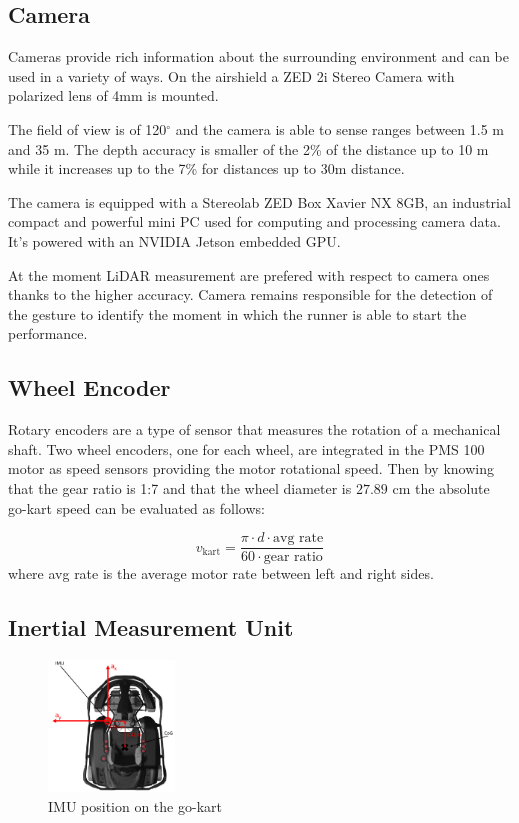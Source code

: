 \documentclass[a4paper,12pt,oneside]{book}
\begin{document}
\subsection{Camera}
Cameras provide rich information about the surrounding environment and can be used in a variety of ways.
On the airshield a ZED 2i Stereo Camera with polarized lens of 4mm is mounted.

The field of view is of 120$^\circ$ and the camera is able to sense ranges between 1.5 m and 35 m. 
The depth accuracy is smaller of the 2\% of the distance up to 10 m while it increases up to the 7\% for distances up to 30m distance.

The camera is equipped with a Stereolab ZED Box Xavier NX 8GB, an industrial compact and powerful mini PC used for computing and processing camera data.
It's powered with an NVIDIA Jetson embedded GPU.

At the moment LiDAR measurement are prefered with respect to camera ones thanks to the higher accuracy.
Camera remains responsible for the detection of the gesture to identify the moment in which the runner is able to start the performance. 

\subsection{Wheel Encoder}
Rotary encoders are a type of sensor that measures the rotation of a mechanical shaft.
Two wheel encoders, one for each wheel, are integrated in the PMS 100 motor as speed sensors providing the motor rotational speed.
Then by knowing that the gear ratio is 1:7 and that the wheel diameter is $27.89$ cm the absolute go-kart speed can be evaluated as follows:

\begin{equation}
    v_{\text{kart}} = \frac{\pi \cdot d \cdot \text{avg rate}}{60 \cdot \text{gear ratio}}
\end{equation}
where avg rate is the average motor rate between left and right sides.



\subsection{Inertial Measurement Unit}

\begin{figure}[h!]
	\centering
	\includegraphics[width=0.3\textwidth]{IMU.png}
\caption{IMU position on the go-kart}
\label{IMU_pose}
\end{figure}
\end{document}

